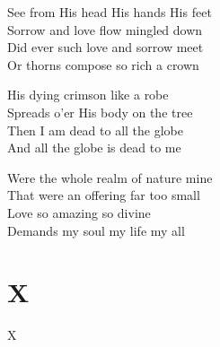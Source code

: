 \documentclass{beamer}
\begin{document}
{\begin{frame}{}
\end{frame}

\hypertarget{When I survey the wondrous cross[](Watts)3}{}
\begin{frame}{}
\fontsize{ 18 }{ 23 }\selectfont

See from His head His hands His feet\\ 
Sorrow and love flow mingled down\\ 
Did ever such love and sorrow meet\\ 
Or thorns compose so rich a crown 

\end{frame}

\hypertarget{When I survey the wondrous cross[](Watts)(4)}{}
\begin{frame}{}
\fontsize{ 18 }{ 23 }\selectfont

His dying crimson like a robe\\ 
Spreads o'er His body on the tree\\ 
Then I am dead to all the globe\\ 
And all the globe is dead to me 

\end{frame}

\hypertarget{When I survey the wondrous cross[](Watts)5}{}
\begin{frame}{}
\fontsize{ 18 }{ 23 }\selectfont

Were the whole realm of nature mine\\ 
That were an offering far too small\\ 
Love so amazing so divine\\ 
Demands my soul my life my all 

\end{frame}

}
\section{X}

\begin{frame}[t]{X}
\begin{columns}[t]

    


    


\end{columns}

\end{frame}
\end{document}
